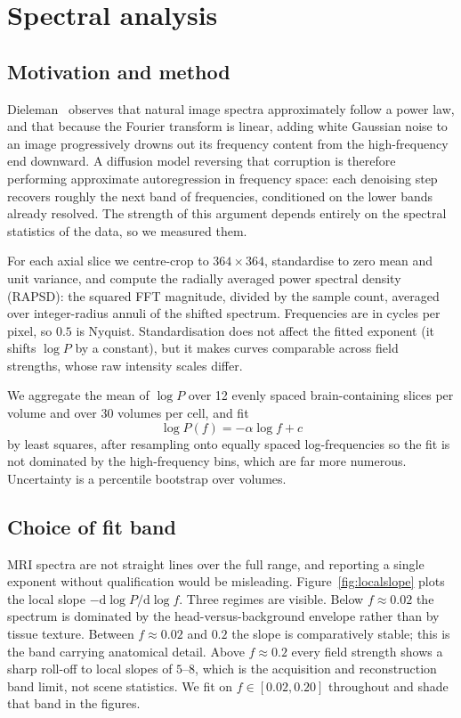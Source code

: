 \documentclass[11pt,a4paper]{article}
\begin{document}
\section{Spectral analysis}
\label{sec:spectral}

\subsection{Motivation and method}

Dieleman~\cite{dieleman2024} observes that natural image spectra approximately follow a power law, and that because the
Fourier transform is linear, adding white Gaussian noise to an image progressively drowns out its
frequency content from the high-frequency end downward. A diffusion model reversing that corruption is
therefore performing approximate autoregression in frequency space: each denoising step recovers
roughly the next band of frequencies, conditioned on the lower bands already resolved. The strength of
this argument depends entirely on the spectral statistics of the data, so we measured them.

For each axial slice we centre-crop to $364 \times 364$, standardise to zero mean and unit variance,
and compute the radially averaged power spectral density (RAPSD): the squared FFT magnitude, divided
by the sample count, averaged over integer-radius annuli of the shifted spectrum. Frequencies are in
cycles per pixel, so $0.5$ is Nyquist. Standardisation does not affect the fitted exponent (it
shifts $\log P$ by a constant), but it makes curves comparable across field strengths, whose raw
intensity scales differ.

We aggregate the mean of $\log P$ over 12 evenly spaced brain-containing slices per volume and over 30
volumes per cell, and fit
\begin{equation}
  \log P(f) = -\alpha \log f + c
\end{equation}
by least squares, after resampling onto equally spaced log-frequencies so the fit is not dominated by
the high-frequency bins, which are far more numerous. Uncertainty is a percentile bootstrap over
volumes.

\subsection{Choice of fit band}

MRI spectra are not straight lines over the full range, and reporting a single exponent without
qualification would be misleading. Figure~\ref{fig:localslope} plots the local slope
$-\mathrm{d}\log P/\mathrm{d}\log f$. Three regimes are visible. Below $f \approx 0.02$ the spectrum is
dominated by the head-versus-background envelope rather than by tissue texture. Between
$f \approx 0.02$ and $0.2$ the slope is comparatively stable; this is the band carrying anatomical
detail. Above $f \approx 0.2$ every field strength shows a sharp roll-off to local slopes of $5$--$8$,
which is the acquisition and reconstruction band limit, not scene statistics. We fit on
$f \in [0.02, 0.20]$ throughout and shade that band in the figures.
\end{document}
